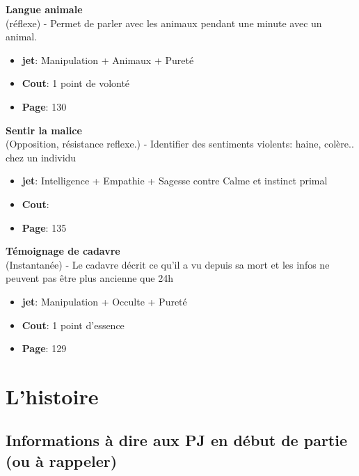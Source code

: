 \documentclass[oneside,12pt]{book}
\newcommand\don[6]{
\textbf{#1} \\
(#6) - #2
\begin{itemize}
\item{ \textbf{jet}: #3}
\item{ \textbf{Cout}: #4}
\item{ \textbf{Page}: #5}
\end{itemize}
\vspace{0.5cm}
}
\begin{document}
\begin{flushleft}
\don{Langue animale}{Permet de parler avec les animaux pendant une minute avec un animal.}{Manipulation + Animaux + Pureté}{1 point de volonté}{130}{réflexe}
\don{Sentir la malice}{Identifier des sentiments violents: haine, colère.. chez un individu}{Intelligence + Empathie + Sagesse contre Calme et instinct primal}{}{135}{Opposition, résistance reflexe.}
\don{Témoignage de cadavre}{Le cadavre décrit ce qu'il a vu depuis sa mort et les infos ne peuvent pas être plus ancienne que 24h}{Manipulation + Occulte + Pureté}{1 point d'essence}{129}{Instantanée}

\chapter{L'histoire}
\section{Informations à dire aux PJ en début de partie  (ou à rappeler) }

\clearpage


\end{flushleft}
\end{document}
